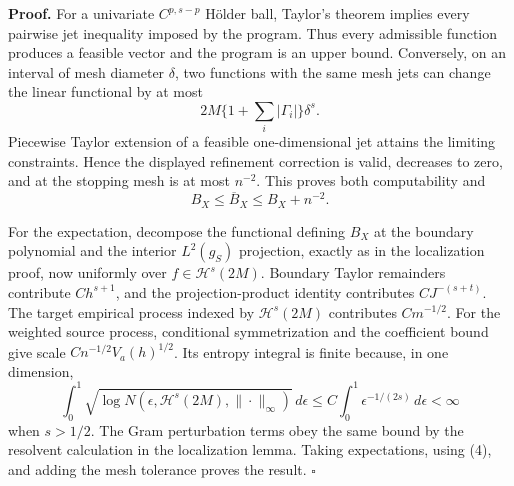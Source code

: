 \textbf{Proof.}
For a univariate \(C^{p,s-p}\) Hölder ball, Taylor's theorem implies every pairwise jet inequality imposed by the program. Thus every admissible function produces a feasible vector and the program is an upper bound. Conversely, on an interval of mesh diameter \(\delta\), two functions with the same mesh jets can change the linear functional by at most
\[
2M\{1+\sum_i|\Gamma_i|\}\delta^s.
\]
Piecewise Taylor extension of a feasible one-dimensional jet attains the limiting constraints. Hence the displayed refinement correction is valid, decreases to zero, and at the stopping mesh is at most \(n^{-2}\). This proves both computability and
\[
B_X\le\overline B_X\le B_X+n^{-2}.
\tag{4}
\]

For the expectation, decompose the functional defining \(B_X\) at the boundary polynomial and the interior \(L^2(g_S)\) projection, exactly as in the localization proof, now uniformly over \(f\in\mathcal H^s(2M)\). Boundary Taylor remainders contribute \(Ch^{s+1}\), and the projection-product identity contributes \(CJ^{-(s+t)}\). The target empirical process indexed by \(\mathcal H^s(2M)\) contributes \(Cm^{-1/2}\). For the weighted source process, conditional symmetrization and the coefficient bound give scale \(Cn^{-1/2}V_a(h)^{1/2}\). Its entropy integral is finite because, in one dimension,
\[
\int_0^1\sqrt{\log N(\epsilon,\mathcal H^s(2M),\|\cdot\|_\infty)}\,d\epsilon
\le C\int_0^1\epsilon^{-1/(2s)}\,d\epsilon<\infty
\]
when \(s>1/2\). The Gram perturbation terms obey the same bound by the resolvent calculation in the localization lemma. Taking expectations, using (4), and adding the mesh tolerance proves the result. \(\square\)